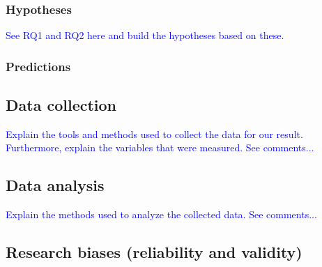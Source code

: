 \subsubsection{Hypotheses}
\textcolor{blue}{See RQ1 and RQ2 here and build the hypotheses based on these.}

\subsubsection{Predictions}

\subsection{Data collection}
%
%
\textcolor{blue}{Explain the tools and methods used to collect the data for our
result. Furthermore, explain the variables that were measured. See comments...}

\subsection{Data analysis}
%
%
%
\textcolor{blue}{Explain the methods used to analyze the collected data. See comments...}

\subsection{Research biases (reliability and validity)}
%

